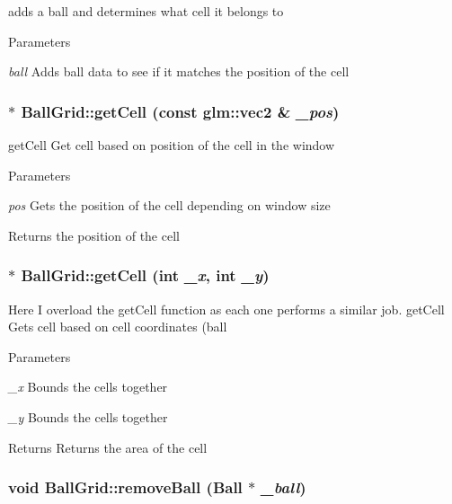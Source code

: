 adds a ball and determines what cell it belongs to 
\begin{DoxyParams}{Parameters}
\item[{\em ball}]Adds ball data to see if it matches the position of the cell \end{DoxyParams}
\hypertarget{classBallGrid_a33f4cad0c6381769f2f49996c8bf7512}{
\subsubsection[{getCell}]{ $\ast$ BallGrid::getCell (const glm::vec2 \& {\em \_\-pos})}}
\label{classBallGrid_a33f4cad0c6381769f2f49996c8bf7512}


getCell Get cell based on position of the cell in the window 
\begin{DoxyParams}{Parameters}
\item[{\em pos}]Gets the position of the cell depending on window size\end{DoxyParams}
\begin{DoxyReturn}{Returns}
the position of the cell 
\end{DoxyReturn}
\hypertarget{classBallGrid_aa75a6ba9c08cc592917bc4c82ddecab9}{
\subsubsection[{getCell}]{ $\ast$ BallGrid::getCell (int {\em \_\-x}, \/  int {\em \_\-y})}}
\label{classBallGrid_aa75a6ba9c08cc592917bc4c82ddecab9}


Here I overload the getCell function as each one performs a similar job. getCell Gets cell based on cell coordinates (ball 
\begin{DoxyParams}{Parameters}
\item[{\em \_\-x}]Bounds the cells together \item[{\em \_\-y}]Bounds the cells together \end{DoxyParams}
\begin{DoxyReturn}{Returns}
Returns the area of the cell 
\end{DoxyReturn}
\hypertarget{classBallGrid_a1a1787d7850c2639e92492f8301e14fb}{
\subsubsection[{removeBall}]{\setlength{\rightskip}{0pt plus 5cm}void BallGrid::removeBall ({\bf Ball} $\ast$ {\em \_\-ball})}}
\label{classBallGrid_a1a1787d7850c2639e92492f8301e14fb}



